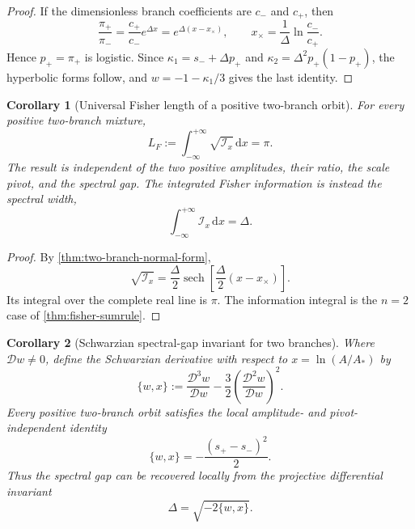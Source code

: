 \documentclass[aps,prd,reprint,onecolumn,nofootinbib,superscriptaddress,showkeys]{revtex4-2}
\numberwithin{equation}{section}
\theoremstyle{definition}
\theoremstyle{plain}
\newtheorem{corollary}{Corollary}[section]
\newcommand{\dd}{\mathrm d}
\newcommand{\Dil}{\mathscr D}
\begin{document}
\begin{proof}
If the dimensionless branch coefficients are $c_-$ and $c_+$, then
\[
\frac{\pi_+}{\pi_-}
=\frac{c_+}{c_-}e^{\Delta x}
=e^{\Delta(x-x_\times)},
\qquad
x_\times=\frac1{\Delta}\ln\frac{c_-}{c_+}.
\]
Hence $p_+=\pi_+$ is logistic.  Since $\kappa_1=s_-+\Delta p_+$ and $\kappa_2=\Delta^2p_+(1-p_+)$, the hyperbolic forms follow, and $w=-1-\kappa_1/3$ gives the last identity.
\end{proof}

\begin{corollary}[Universal Fisher length of a positive two-branch orbit]\label{cor:fisher-pi}
For every positive two-branch mixture,
\begin{equation}
\boxed{
L_F:=\int_{-\infty}^{+\infty}\sqrt{\mathcal I_x}\,\dd x=\pi.
}
\end{equation}
The result is independent of the two positive amplitudes, their ratio, the scale pivot, and the spectral gap.  The integrated Fisher information is instead the spectral width,
\begin{equation}
\int_{-\infty}^{+\infty}\mathcal I_x\,\dd x=\Delta.
\end{equation}
\end{corollary}

\begin{proof}
By \cref{thm:two-branch-normal-form},
\[
\sqrt{\mathcal I_x}
=\frac{\Delta}{2}\operatorname{sech}\!\left[\frac{\Delta}{2}(x-x_\times)\right].
\]
Its integral over the complete real line is $\pi$.  The information integral is the $n=2$ case of \cref{thm:fisher-sumrule}.
\end{proof}

\begin{corollary}[Schwarzian spectral-gap invariant for two branches]\label{cor:schwarzian-gap}
Where $\Dil w\ne0$, define the Schwarzian derivative with respect to $x=\ln(A/A_*)$ by
\begin{equation}
\{w,x\}:=
\frac{\Dil^3w}{\Dil w}
-\frac32\left(\frac{\Dil^2w}{\Dil w}\right)^2.
\end{equation}
Every positive two-branch orbit satisfies the local amplitude- and pivot-independent identity
\begin{equation}
\boxed{
\{w,x\}=-\frac{(s_+-s_-)^2}{2}.
}
\end{equation}
Thus the spectral gap can be recovered locally from the projective differential invariant
\begin{equation}
\boxed{
\Delta=\sqrt{-2\{w,x\}}.
}
\end{equation}
\end{corollary}
\end{document}

